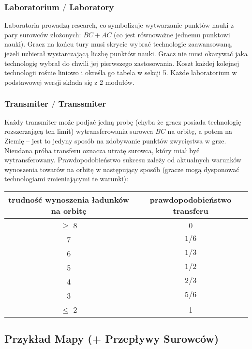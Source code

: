 \documentclass[11pt,a4paper]{article}
\begin{document}
\subsubsection{Laboratorium $/$ Laboratory}

Laboratoria prowadzą research, co symbolizuje wytwarzanie punktów nauki z pary surowców złożonych: $BC + AC$ (co jest równoważne jednemu punktowi nauki). Gracz na końcu tury musi skrycie wybrać technologie zaawansowaną, jeżeli uzbierał wystarczającą liczbę punktów nauki. Gracz nie musi okazywać jaka technologię wybrał do chwili jej pierwszego zastosowania. Koszt każdej kolejnej technologii rośnie liniowo i określa go tabela w sekcji 5. Każde laboratorium w podstawowej wersji składa się z 2 modułów. 

\subsubsection{Transmiter $/$ Transsmiter}

Każdy transmiter może podjać jedną probę (chyba że gracz posiada technologię rozszerzającą ten limit) wytransferowania surowca $BC$ na orbitę, a potem na Ziemię -- jest to jedyny sposób na zdobywanie punktów zwycięstwa w grze. Nieudana próba transferu oznacza utratę surowca, który miał być wytransferowany. Prawdopodobieństwo sukcesu zależy od aktualnych warunków wynoszenia towarów na orbitę w następujący sposób (gracze mogą dysponować technologiami zmieniającymi te warunki):
\begin{center}
  \begin{tabular}{| c | c |}
    \hline
    \textbf{trudność wynoszenia ładunków na orbitę} & \textbf{prawdopodobieństwo transferu}\\
    \hline
     $\ge$ 8 & 0 \\
    \hline
    7 & $1/6$ \\
    \hline
    6 & $1/3$ \\
    \hline
    5 & $1/2$ \\
    \hline
    4 & $2/3$ \\
    \hline
    3 & $5/6$ \\
    \hline
     $\le$ 2  & 1 \\
    \hline
  \end{tabular}
\end{center}

\subsection{Przykład Mapy (+ Przepływy Surowców)}
\end{document}

